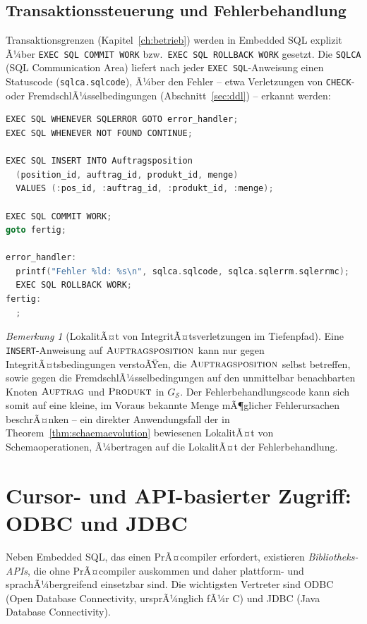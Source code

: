 ﻿\documentclass[a4paper,12pt]{report}
\theoremstyle{definition}
\theoremstyle{remark}
\newtheorem{remark}{Bemerkung}[chapter]
\begin{document}
\subsection{Transaktionssteuerung und Fehlerbehandlung}
\label{sec:embedded-transaktionen}

Transaktionsgrenzen (Kapitel~\ref{ch:betrieb}) werden in Embedded SQL
explizit Ã¼ber \texttt{EXEC SQL COMMIT WORK} bzw.\ \texttt{EXEC SQL
ROLLBACK WORK} gesetzt. Die \texttt{SQLCA} (SQL Communication Area)
liefert nach jeder \texttt{EXEC SQL}-Anweisung einen Statuscode
(\texttt{sqlca.sqlcode}), Ã¼ber den Fehler -- etwa Verletzungen von
\texttt{CHECK}- oder FremdschlÃ¼sselbedingungen
(Abschnitt~\ref{sec:ddl}) -- erkannt werden:

\begin{lstlisting}[language=C]
EXEC SQL WHENEVER SQLERROR GOTO error_handler;
EXEC SQL WHENEVER NOT FOUND CONTINUE;

EXEC SQL INSERT INTO Auftragsposition
  (position_id, auftrag_id, produkt_id, menge)
  VALUES (:pos_id, :auftrag_id, :produkt_id, :menge);

EXEC SQL COMMIT WORK;
goto fertig;

error_handler:
  printf("Fehler %ld: %s\n", sqlca.sqlcode, sqlca.sqlerrm.sqlerrmc);
  EXEC SQL ROLLBACK WORK;
fertig:
  ;
\end{lstlisting}

\begin{remark}[LokalitÃ¤t von IntegritÃ¤tsverletzungen im Tiefenpfad]
Eine \texttt{INSERT}-Anweisung auf $\textsc{Auftragsposition}$ kann
nur gegen IntegritÃ¤tsbedingungen verstoÃŸen, die $\textsc{Auftragsposition}$
selbst betreffen, sowie gegen die FremdschlÃ¼sselbedingungen auf den
unmittelbar benachbarten Knoten $\textsc{Auftrag}$ und
$\textsc{Produkt}$ in $G_{\mathcal{S}}$. Der Fehlerbehandlungscode kann
sich somit auf eine kleine, im Voraus bekannte Menge mÃ¶glicher
Fehlerursachen beschrÃ¤nken -- ein direkter Anwendungsfall der in
Theorem~\ref{thm:schaemaevolution} bewiesenen LokalitÃ¤t von
Schemaoperationen, Ã¼bertragen auf die LokalitÃ¤t der
Fehlerbehandlung.
\end{remark}

\section{Cursor- und API-basierter Zugriff: ODBC und JDBC}
\label{sec:odbc-jdbc}

Neben Embedded SQL, das einen PrÃ¤compiler erfordert, existieren
\emph{Bibliotheks-APIs}, die ohne PrÃ¤compiler auskommen und daher
plattform- und sprachÃ¼bergreifend einsetzbar sind. Die wichtigsten
Vertreter sind ODBC (Open Database Connectivity, ursprÃ¼nglich fÃ¼r C)
und JDBC (Java Database Connectivity).
\end{document}
